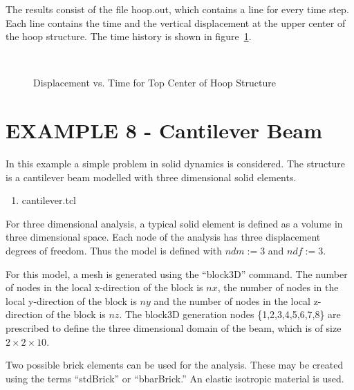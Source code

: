 \documentclass[12pt]{article}
\begin{document}
\vspace{0.2in} 

The results consist of the file hoop.out, which contains a line for
every time step. 
Each line contains the time and the vertical
displacement 
at the upper center of the hoop structure.
The time history is shown in
figure~\ref{shelldisp}. 
\begin{figure}[h]
\begin{center}
\leavevmode
\hbox{%
\epsfxsize=4.0in
\epsfysize=2.8in
}
\end{center}
\caption{Displacement vs. Time for Top Center of Hoop Structure}
\label{shelldisp}
\end{figure}



\clearpage
\section {EXAMPLE 8 - Cantilever Beam}

In this example a simple problem in solid dynamics is considered.
The structure is a cantilever beam modelled with three dimensional
solid elements.


\vspace{0.2in}  
\begin{enumerate} 
\item cantilever.tcl
\end{enumerate}

\vspace{0.2in} 


For three dimensional analysis, a typical solid element is defined as a volume 
in three dimensional space.  Each node of the analysis has three displacement
degrees of freedom.  Thus the model is defined with 
$ndm := 3$ and $ndf := 3$.

For this model, a mesh is generated using the ``block3D'' command.  The number of 
nodes in the local x-direction of the block is $nx$,
the number of nodes in the local y-direction of the block is $ny$
and the number of nodes in the local z-direction of the block is $nz$.
The block3D generation nodes \{1,2,3,4,5,6,7,8\} are prescribed to define 
the three dimensional domain of the beam, which is of size $2\times2\times10$.

Two possible brick elements can be used for the analysis.
These may be created using the terms
``stdBrick'' or
``bbarBrick.''  
An elastic isotropic material is used.
\end{document}
